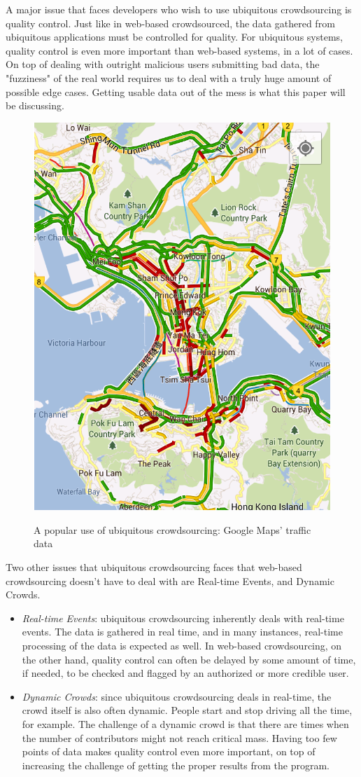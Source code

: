 \documentclass[9pt,twocolumn]{article}
\begin{document}
	A major issue that faces developers who wish to use ubiquitous crowdsourcing is quality control. Just like in web-based crowdsourced, the data gathered from ubiquitous applications must be controlled for quality. For ubiquitous systems, quality control is even more important than web-based systems, in a lot of cases. On top of dealing with outright malicious users submitting bad data, the "fuzziness" of the real world requires us to deal with a truly huge amount of possible edge cases. Getting usable data out of the mess is what this paper will be discussing.
	
	\begin{figure}
		\centering \includegraphics[width=0.7\columnwidth]{maps-traffic}
		\label{fig-traffic}
		\caption{A popular use of ubiquitous crowdsourcing: Google Maps' traffic data}
	\end{figure}

	Two other issues that ubiquitous crowdsourcing faces that web-based crowdsourcing doesn't have to deal with are Real-time Events, and Dynamic Crowds.
	\begin{itemize}
		\item \emph{Real-time Events}: ubiquitous crowdsourcing inherently deals with real-time events. The data is gathered in real time, and in many instances, real-time processing of the data is expected as well. %
		In web-based crowdsourcing, on the other hand, quality control can often be delayed by some amount of time, if needed, to be checked and flagged by an authorized or more credible user. 
		
		
		\item \emph{Dynamic Crowds}: since ubiquitous crowdsourcing deals in real-time, the crowd itself is also often dynamic. People start and stop driving all the time, for example. The challenge of a dynamic crowd is that there are times when the number of contributors might not reach critical mass. Having too few points of data makes quality control even more important, on top of increasing the challenge of getting the proper results from the program.
	\end{itemize}
	
\end{document}
